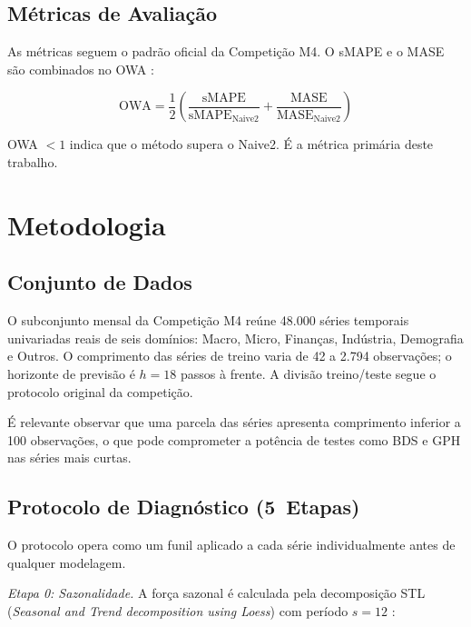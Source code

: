 \documentclass[12pt, a4paper]{article}
\begin{document}
\subsection{Métricas de Avaliação}

As métricas seguem o padrão oficial da Competição M4. O sMAPE
\cite{makridakis1993accuracy} e o MASE \cite{hyndman2006another}
são combinados no OWA \cite{makridakis2018m4results}:

\begin{equation}
  \text{OWA} = \frac{1}{2}\!\left(
    \frac{\text{sMAPE}}{\text{sMAPE}_{\text{Naive2}}}
    + \frac{\text{MASE}}{\text{MASE}_{\text{Naive2}}}
  \right)
  \label{eq:owa}
\end{equation}

OWA $< 1$ indica que o método supera o Naive2. É a métrica primária deste
trabalho.

\section{Metodologia}

\subsection{Conjunto de Dados}

O subconjunto mensal da Competição M4 \cite{makridakis2020m4} reúne 48.000
séries temporais univariadas reais de seis domínios: Macro, Micro, Finanças,
Indústria, Demografia e Outros. O comprimento das séries de treino varia de
42 a 2.794 observações; o horizonte de previsão é $h = 18$ passos à frente.
A divisão treino/teste segue o protocolo original da competição.

É relevante observar que uma parcela das séries apresenta comprimento inferior
a 100 observações, o que pode comprometer a potência de testes como BDS e GPH
nas séries mais curtas.

\subsection{Protocolo de Diagnóstico (5~Etapas)}

O protocolo opera como um funil aplicado a cada série individualmente antes
de qualquer modelagem.

\textit{Etapa 0: Sazonalidade.} A força sazonal é calculada pela
decomposição STL (\textit{Seasonal and Trend decomposition using Loess})
com período $s = 12$ \cite{hyndman2018forecasting}:
\end{document}
